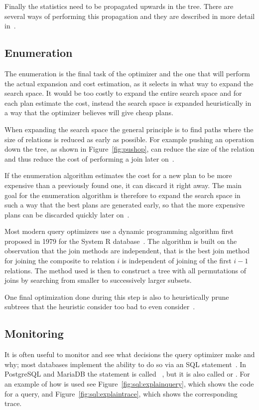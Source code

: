 Finally the statistics need to be propagated upwards in the tree. There are several ways of performing this propagation and they are described in more detail in~\cite{chaudhuri_1998_overview_aooqoirs}.

\subsection{Enumeration}
The enumeration is the final task of the optimizer and the one that will perform the actual expansion and cost estimation, as it selects in what way to expand the search space. It would be too costly to expand the entire search space and for each plan estimate the cost, instead the search space is expanded heuristically in a way that the optimizer believes will give cheap plans.

When expanding the search space the general principle is to find paths where the size of relations is reduced as early as possible. For example pushing an operation down the tree, as shown in Figure~\ref{fig:pushop}, can reduce the size of the relation and thus reduce the cost of performing a join later on~\cite[p. 772-774]{garcia-molina_2002_database_dstcb}.

If the enumeration algorithm estimates the cost for a new plan to be more expensive than a previously found one, it can discard it right away. The main goal for the enumeration algorithm is therefore to expand the search space in such a way that the best plans are generated early, so that the more expensive plans can be discarded quickly later on~\cite{nica_2012_analyzing_aqoppojea}.

Most modern query optimizers use a dynamic programming algorithm first proposed in 1979 for the System R database~\cite{selinger_1979_access_apsiardms}. The algorithm is built on the observation that the join methods are independent, that is the best join method for joining the composite to relation $i$ is independent of joining of the first $i-1$ relations. The method used is then to construct a tree with all permutations of joins by searching from smaller to successively larger subsets.

One final optimization done during this step is also to heuristically prune subtrees that the heuristic consider too bad to even consider~\cite{ono_1990_measuring_mtcojeiqo}.

\subsection{Monitoring}
It is often useful to monitor and see what decisions the query optimizer make and why; most databases implement the ability to do so via an SQL statement~\cite[p. 34]{lahdenmaki_2005_relational_rdidatodossea}. In PostgreSQL and MariaDB the statement is called  \cite{postgresql_pd9e}~\cite{explain_emkb}, but it is also called  or . For an example of how  is used see Figure~\ref{fig:sql:explainquery}, which shows the code for a query, and Figure~\ref{fig:sql:explaintrace}, which shows the corresponding trace.

